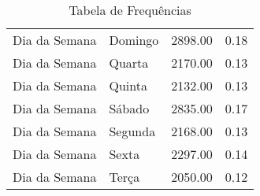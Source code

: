 \begin{table}[ht]
\begin{tabular}{llrr}
  Dia da Semana & Domingo & 2898.00 & 0.18 \\ 
  Dia da Semana & Quarta & 2170.00 & 0.13 \\ 
  Dia da Semana & Quinta & 2132.00 & 0.13 \\ 
  Dia da Semana & Sábado & 2835.00 & 0.17 \\ 
  Dia da Semana & Segunda & 2168.00 & 0.13 \\ 
  Dia da Semana & Sexta & 2297.00 & 0.14 \\ 
  Dia da Semana & Terça & 2050.00 & 0.12 \\ 
   \hline
\end{tabular}
\caption{Tabela de Frequências} 
\end{table}
